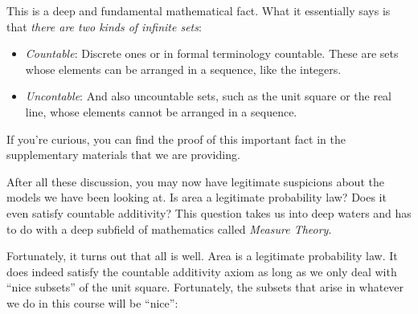 \documentclass[pdftex, brazil, 12pt, twoside]{article}
\begin{document}
This is a deep and fundamental mathematical fact.
What it essentially says is that \emph{there are two kinds of
  infinite sets}:

\begin{itemize}
\item \emph{Countable}: Discrete ones or in formal terminology countable.
  These are sets whose elements can be arranged in a sequence,
  like the integers.
\item \emph{Uncontable}: And also uncountable sets, such as the unit square or the
  real line, whose elements cannot be arranged in a sequence.
\end{itemize}

If you're curious, you can find the proof of this
important fact in the supplementary materials that
we are providing.

After all these discussion, you may now have legitimate
suspicions about the models we have been looking at.
Is area a legitimate probability law?
Does it even satisfy countable additivity?
This question takes us into deep waters and has to do with
a deep subfield of mathematics called \emph{Measure Theory}.

Fortunately, it turns out that all is well.
Area is a legitimate probability law.
It does indeed satisfy the countable additivity axiom as
long as we only deal with ``nice subsets'' of the unit square.
Fortunately, the subsets that arise in whatever we do in
this course will be ``nice'':

\begin{figure}[H]
  \begin{center}
  \end{center}
\end{figure}
\end{document}
